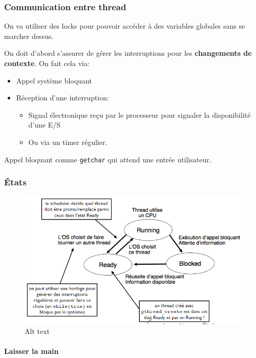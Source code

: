 \subsubsection{Communication entre
thread}\label{communication-entre-thread}

On va utiliser des locks pour pouvoir accéder à des variables globales
sans se marcher dessus.

On doit d'abord s'assurer de gérer les interruptions pour les
\textbf{changements de contexte}. On fait cela via:

\begin{itemize}
\tightlist
\item
  Appel système bloquant
\item
  Réception d'une interruption:

  \begin{itemize}
  \tightlist
  \item
    Signal électronique reçu par le processeur pour signaler la
    disponibilité d'une E/S
  \item
    Ou via un timer régulier.
  \end{itemize}
\end{itemize}

Appel bloquant comme \texttt{getchar} qui attend une entrée utilisateur.

\subsubsection{États}\label{uxe9tats}

\begin{figure}
\centering
\includegraphics{image-24.png}
\caption{Alt text}
\end{figure}

\paragraph{Laisser la main}\label{laisser-la-main}

